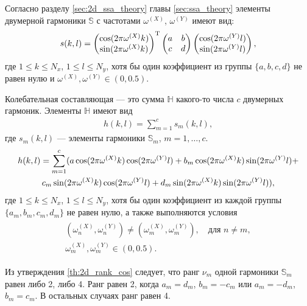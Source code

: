 \documentclass[specialist,
               substylefile = spbu.rtx,
               subf,href,colorlinks=true, 12pt]{disser}
\begin{document}
{{Согласно разделу \ref{sec:2d_ssa_theory} главы \ref{sec:ssa_theory} элементы двумерной гармоники $\mathbb{S}$ с частотами $\omega^{(X)}$, $\omega^{(Y)}$ имеют вид:
\begin{gather} \label{eq:2d_cos_el}
\notag
s(k,l) =  \left(
\begin{matrix}
\cos(2\pi \omega^{(X)}k) \\ \notag
\sin(2\pi \omega^{(X)}k)
\end{matrix}
\right)^{\mathrm{T}}
 \left(
\begin{matrix}
a & b \\
c & d
\end{matrix}
\right)
 \left(
\begin{matrix}
\cos(2\pi \omega^{(Y)}l) \\ \notag
\sin(2\pi \omega^{(Y)}l)
\end{matrix}
\right),
\notag
\end{gather}
где $1 \leqslant k \leqslant N_x$, $1 \leqslant l \leqslant N_y$, хотя бы один коэффициент из  группы $\{a,b,c,d\}$ не равен нулю и
$\omega^{(X)}, \omega^{(Y)} \in (0,0.5)$.

Колебательная составляющая --- это сумма $\mathbb{H}$ какого-то числа $c$ двумерных гармоник. Элементы $\mathbb{H}$ имеют вид
\begin{gather} \label{eq:2d_cos}
h(k,l) = \sum_{m=1}^{c}{s_m(k,l)},
\end{gather}
где $s_m(k,l)$ --- элементы гармоники $\mathbb{S}_m$, $m=1,\ldots,c$.
\begin{gather} 
\notag
h(k,l) = \sum_{m=1}^{c}(a \cos(2\pi \omega^{(X)}k) \cos(2\pi \omega^{(Y)}l) +
b_m \cos(2\pi \omega^{(X)}k) \sin(2\pi \omega^{(Y)}l) + \\ \label{eq:2d_cos_el}
c_m \sin(2\pi \omega^{(X)}k) \cos(2\pi \omega^{(Y)}l) +
d_m \sin(2\pi \omega^{(X)}k) \sin(2\pi \omega^{(Y)}l)),
\end{gather}
где $1 \leqslant k \leqslant N_x$, $1 \leqslant l \leqslant N_y$, хотя бы один коэффициент из каждой группы $\{a_m,b_m,c_m,d_m\}$ не равен нулю, а также выполняются условия 
\begin{align} \label{eq:2d_omega}
\begin{matrix}
(\omega_n^{(X)}, \omega_n^{(Y)}) \not = (\omega_m^{(X)}, \omega_m^{(Y)}), \quad \text{для } n \not= m,\\
\omega_m^{(X)}, \omega_m^{(Y)} \in (0,0.5).
\end{matrix}
\end{align}

Из утверждения \ref{th:2d_rank_cos} следует, что ранг $\nu_m$ одной гармоники $\mathbb{S}_m$ равен либо 2, либо 4. Ранг равен 2, когда $a_m = d_m$, $b_m = -c_m$ или $a_m = -d_m$, $b_m = c_m$. В остальных случаях ранг равен 4.

}}
\end{document}
